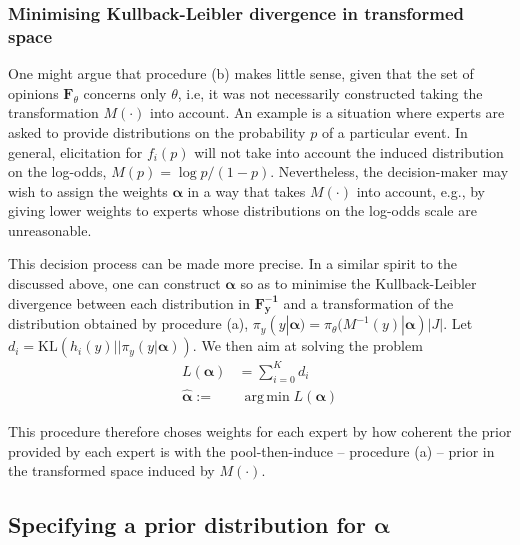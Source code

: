 \documentclass[a4paper, notitlepage, 10pt]{article}
\DeclareMathOperator*{\argmin}{arg\,min}
\begin{document}
\subsubsection*{Minimising Kullback-Leibler divergence in transformed space}

One might argue that procedure (b) makes little sense, given that the set of opinions $\mathbf{F}_{\theta}$ concerns only $\theta$, i.e, it was not necessarily constructed taking the transformation $M(\cdot)$ into account.
An example is a situation where experts are asked to provide distributions on the probability $p$ of a particular event.
In general, elicitation for $f_i(p)$ will not take into account the induced distribution on the log-odds, $M(p) = \log p/(1-p)$.
Nevertheless, the decision-maker may wish to assign the weights $\boldsymbol\alpha$ in a way that takes $M(\cdot)$ into account, e.g., by giving lower weights to experts whose distributions on the log-odds scale are unreasonable.

This decision process can be made more precise.
In a similar spirit to the discussed above, one can construct $\boldsymbol\alpha$ so as to minimise the Kullback-Leibler divergence between each distribution in $\mathbf{F^{-1}_y}$ and a transformation of the distribution obtained by procedure (a), $\pi_{y}(y | \boldsymbol\alpha) = \pi_{\theta}( M^{-1}(y)| \boldsymbol\alpha)|J|$.
Let $d_i = \text{KL}( h_i(y) || \pi_{y}(y | \boldsymbol\alpha))$.
We then aim at solving the problem
\begin{align}
L(\boldsymbol\alpha) &= \sum_{i=0}^Kd_i \\
     \hat{\boldsymbol\alpha}:=& \:\argmin L(\boldsymbol\alpha)  \nonumber
\end{align}

This procedure therefore choses weights for each expert by how coherent the prior provided by each expert is with the pool-then-induce -- procedure (a) -- prior in the transformed space induced by $M(\cdot)$.

\subsection*{Specifying a prior distribution for $\boldsymbol\alpha$}
\end{document}
